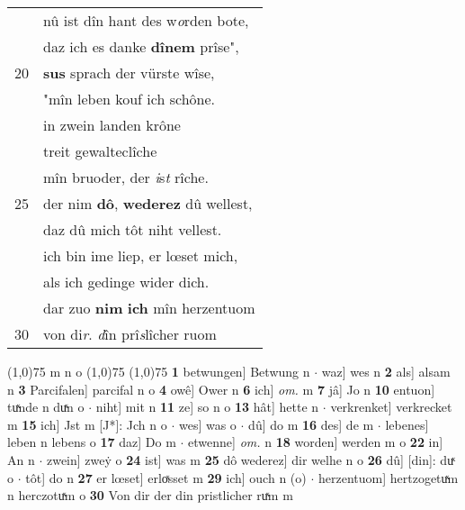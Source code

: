 \documentclass[8pt,a4paper,notitlepage]{article}
\begin{document}
\begin{table}[ht]
\begin{minipage}[t]{0.5\linewidth}
\begin{tabular}{rl}
 & nû ist dîn hant des w\textit{o}rden bote,\\ 
 & daz ich es danke \textbf{dînem} prîse",\\ 
20 & \textbf{sus} sprach der vürste wîse,\\ 
 & "mîn leben kouf ich schône.\\ 
 & in zwein landen krône\\ 
 & treit gewalteclîche\\ 
 & mîn bruoder, der \textit{i}s\textit{t} rîche.\\ 
25 & der nim \textbf{dô}, \textbf{wederez} dû wellest,\\ 
 & daz dû mich tôt niht vellest.\\ 
 & ich bin ime liep, er lœset mich,\\ 
 & als ich gedinge wider dich.\\ 
 & dar zuo \textbf{nim} \textbf{ich} mîn herzentuom\\ 
30 & von di\textit{r}. \textit{d}în prî\textit{s}lîcher ruom\\ 
\end{tabular}
\scriptsize
\line(1,0){75} \newline
m n o \newline
\line(1,0){75} \newline
\newline
\line(1,0){75} \newline
\textbf{1} betwungen] Betwung n  $\cdot$ waz] wes n \textbf{2} als] alsam n \textbf{3} Parcifalen] parcifal n o \textbf{4} owê] Ower n \textbf{6} ich] \textit{om.} m \textbf{7} jâ] Jo n \textbf{10} entuon] tuͯnde n duͯn o  $\cdot$ niht] mit n \textbf{11} ze] so n o \textbf{13} hât] hette n  $\cdot$ verkrenket] verkrecket m \textbf{15} ich] Jst m [J*]: Jch n o  $\cdot$ wes] was o  $\cdot$ dû] do m \textbf{16} des] de m  $\cdot$ lebenes] leben n lebens o \textbf{17} daz] Do m  $\cdot$ etwenne] \textit{om.} n \textbf{18} worden] werden m o \textbf{22} in] An n  $\cdot$ zwein] zweẏ o \textbf{24} ist] was m \textbf{25} dô wederez] dir welhe n o \textbf{26} dû] [din]: duͯ o  $\cdot$ tôt] do n \textbf{27} er lœset] erloͯsset m \textbf{29} ich] ouch n (o)  $\cdot$ herzentuom] hertzogetuͯm n herczotuͯm o \textbf{30} Von dir der din pristlicher ruͯm m \newline
\end{minipage}
\end{table}
\newpage
\end{document}
